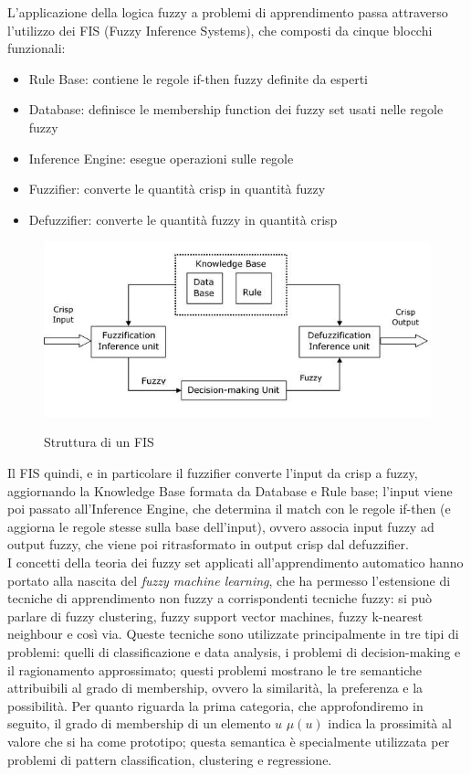 \documentclass[oneside, openany]{book}
\begin{document}
		L'applicazione della logica fuzzy a problemi di apprendimento passa attraverso l'utilizzo dei FIS (Fuzzy Inference Systems), che composti da cinque blocchi funzionali: 
		\begin{itemize}
			\item{Rule Base}: contiene le regole if-then fuzzy definite da esperti
			\item{Database}: definisce le membership function dei fuzzy set usati nelle regole fuzzy
			\item{Inference Engine}: esegue operazioni sulle regole
			\item{Fuzzifier}: converte le quantità crisp in quantità fuzzy
			\item{Defuzzifier}: converte le quantità fuzzy in quantità crisp
		\end{itemize}
		\begin{figure}[h]
			\centering
			{\includegraphics[width=.80\textwidth]{fis.jpg}} \quad
			\caption{Struttura di un FIS}
			\label{fig:fis}
		\end{figure}
	
		Il FIS quindi, e in particolare il fuzzifier converte l'input da crisp a fuzzy, aggiornando la Knowledge Base formata da Database e Rule base; l'input viene poi passato all'Inference Engine, che determina il match con le regole if-then (e aggiorna le regole stesse sulla base dell'input), ovvero associa input fuzzy ad output fuzzy, che viene poi ritrasformato in output crisp dal defuzzifier.
		\\
		I concetti della teoria dei fuzzy set applicati all'apprendimento automatico hanno portato alla nascita del \textit{fuzzy machine learning}, che ha permesso l'estensione di tecniche di apprendimento non fuzzy a corrispondenti tecniche fuzzy: si può parlare di fuzzy clustering, fuzzy support vector machines, fuzzy k-nearest neighbour e così via. Queste tecniche sono utilizzate principalmente in tre tipi di problemi: quelli di classificazione e data analysis, i problemi di decision-making e il ragionamento approssimato; questi problemi mostrano le tre semantiche attribuibili al grado di membership, ovvero la similarità, la preferenza e la possibilità.
		Per quanto riguarda la prima categoria, che approfondiremo in seguito, il grado di membership di un elemento $u$ $\mu(u)$ indica la prossimità al valore che si ha come prototipo; questa semantica è specialmente utilizzata per problemi di pattern classification, clustering e regressione.
		
\end{document}
